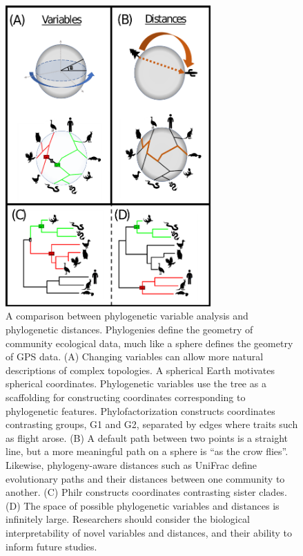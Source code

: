 \begin{figure}[H]
        \centering
        \includegraphics[width=0.7\textwidth]{ch1/figure2.png}
        \caption[A comparison between phylogenetic variable analysis and phylogenetic distances.]
        {A comparison between phylogenetic variable analysis and phylogenetic distances. Phylogenies define the geometry of community ecological data, much like a sphere defines the geometry of GPS data. (A) Changing variables can allow more natural descriptions of complex topologies. A spherical Earth motivates spherical coordinates. Phylogenetic variables use the tree as a scaffolding for constructing coordinates corresponding to phylogenetic features. Phylofactorization constructs coordinates contrasting groups, G1 and G2, separated by edges where traits such as flight arose. (B) A default path between two points is a straight line, but a more meaningful path on a sphere is “as the crow flies”. Likewise, phylogeny-aware distances such as UniFrac define evolutionary paths and their distances between one community to another. (C) Ph\gls{ilr} constructs coordinates contrasting sister clades. (D) The space of possible phylogenetic variables and distances is infinitely large. Researchers should consider the biological interpretability of novel variables and distances, and their ability to inform future studies.}
        \label{figa2}
\end{figure}
